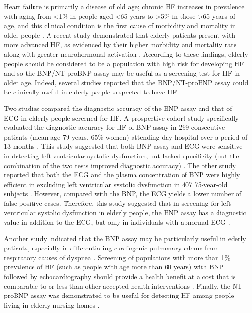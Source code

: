 \documentclass[14pt,a4paper,onecolumn]{extarticle}
\begin{document}
Heart failure is primarily a disease of old age; chronic HF increases in prevalence with
aging from <1\% in people aged <65 years to >5\% in those >65 years of age, and this
clinical condition is the first cause of morbidity and mortality in older people \citep{bib368} \citep{bib369} \citep{bib370} \citep{bib3142}. A recent study demonstrated that elderly patients present with more advanced HF,
as evidenced by their higher morbidity and mortality rate along with greater neurohormonal activation \citep{bib3142}. According to these findings, elderly people should be considered to be a population with high risk for developing HF and so the BNP/NT-proBNP assay may be useful as a screening test for HF in older age. Indeed, several studies
reported that the BNP/NT-proBNP assay could be clinically useful in elderly people
suspected to have HF \citep{bib316} \citep{bib3142} \citep{bib3143} \citep{bib3144} \citep{bib3145} \citep{bib3146} \citep{bib3147}.

Two studies compared the diagnostic accuracy of the BNP assay and that of ECG in
elderly people screened for HF. A prospective cohort study specifically evaluated the
diagnostic accuracy for HF of BNP assay in 299 consecutive patients (mean age 79 years,
65\% women) attending day-hospital over a period of 13 months \citep{bib3143}. This study suggested that both BNP assay and ECG were sensitive in detecting left ventricular systolic
dysfunction, but lacked specificity (but the combination of the two tests improved diagnostic accuracy) \citep{bib3143}. The other study reported that both the ECG and the plasma concentration of BNP were highly efficient in excluding left ventricular systolic dysfunction in 407 75-year-old subjects \citep{bib3144}. However, compared with the BNP, the ECG yields
a lower number of false-positive cases. Therefore, this study suggested that in screening for left ventricular systolic dysfunction in elderly people, the BNP assay has a diagnostic value in addition to the ECG, but only in individuals with abnormal ECG \citep{bib3144}.

Another study indicated that the BNP assay may be particularly useful in ederly
patients, especially in differentiating cardiogenic pulmonary edema from respiratory
causes of dyspnea \citep{bib3146}. Screening of populations with more than 1\% prevalence of
HF (such as people with age more than 60 years) with BNP followed by echocardiography
should provide a health benefit at a cost that is comparable to or less than other accepted health interventions \citep{bib3145}. Finally, the NT-proBNP assay was demonstrated to be
useful for detecting HF among people living in elderly nursing homes \citep{bib3147}.
\end{document}
